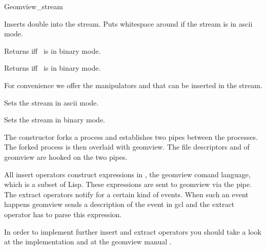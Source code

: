 \begin{ccClass}{Geomview_stream}
\begin{ccAdvanced}
{Inserts double  into the stream. Puts whitespace around if the
stream is in ascii mode.}

{Returns  iff \ccVar\ is in binary mode.}

{Returns  iff \ccVar\ is in binary mode.}


For convenience we offer the manipulators  and 
that can be inserted in the stream.

{Sets the stream in ascii mode.}

{Sets the stream in binary mode.}

\end{ccAdvanced}


\ccImplementation

The constructor forks a process and establishes two pipes between the
processes. The forked process is then overlaid with geomview. The
file descriptors  and  of geomview are hooked
on the two pipes.

All insert operators construct expressions in , the geomview
comand language, which is a subset of {\sc Lisp}. These expressions
are sent to geomview via the pipe. The extract operators notify 
for a certain kind of events. When such an event happens geomview
sends a description of the event in gcl and the extract operator has
to parse this expression.

In order to implement further insert and extract operators you should
take a look at the implementation \cite{f-higso-97} and at the geomview
manual \cite{p-gmgv16-96}.
\end{ccClass}


